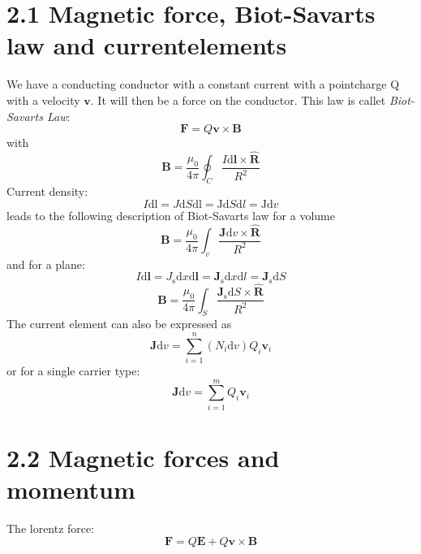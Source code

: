 \documentclass[
12pt, reprint, aip, onecolumn, notitlepage
]{revtex4-1}
\begin{document}
\section{2.1 Magnetic force, Biot-Savarts law and currentelements}
We have a conducting conductor with a constant current with a pointcharge Q with a velocity $\mathbf{v}$. It will then be a force on the conductor. This law is callet \textit{Biot-Savarts Law}:
\begin{equation}
\mathbf{F}=Q \mathbf{v} \times \mathbf{B}
\end{equation}
with
\begin{equation}
\mathbf{B}=\frac{\mu_{0}}{4 \pi} \oint_{C} \frac{I \mathrm{d} \mathbf{l} \times \hat{\mathbf{R}}}{R^{2}}
\end{equation}
Current density:
\begin{equation}
I \mathrm{d} \mathrm{l}=J \mathrm{d} S \mathrm{d} \mathrm{l}=\mathrm{J} \mathrm{d} S \mathrm{d} l=\mathrm{J} \mathrm{d} v
\end{equation}
leads to the following description of Biot-Savarts law for a volume
\begin{equation}
\mathbf{B}=\frac{\mu_{0}}{4 \pi} \int_{v} \frac{\mathbf{J} \mathrm{d} v \times \hat{\mathbf{R}}}{R^{2}}
\end{equation}
and for a plane:
\begin{equation}
I \mathrm{d} \mathbf{l}=J_{\mathrm{s}} \mathrm{d} x \mathrm{d} \mathbf{l}=\mathbf{J}_{\mathrm{s}} \mathrm{d} x \mathrm{d} l=\mathbf{J}_{\mathrm{s}} \mathrm{d} S
\end{equation}
\begin{equation}
\mathbf{B}=\frac{\mu_{0}}{4 \pi} \int_{S} \frac{\mathbf{J}_{\mathrm{s}} \mathrm{d} S \times \hat{\mathbf{R}}}{R^{2}}
\end{equation}
The current element can also be expressed as
\begin{equation}
\mathbf{J} \mathrm{d} v=\sum_{i=1}^{n}\left(N_{i} \mathrm{d} v\right) Q_{i} \mathbf{v}_{i}
\end{equation}
or for a single carrier type:
\begin{equation}
\mathbf{J} \mathrm{d} v=\sum_{i=1}^{m} Q_{i} \mathbf{v}_{i}
\end{equation}

\section{2.2 Magnetic forces and momentum}
The lorentz force:
\begin{equation}
\mathbf{F}=Q \mathbf{E}+Q \mathbf{v} \times \mathbf{B}
\end{equation}
\end{document}
